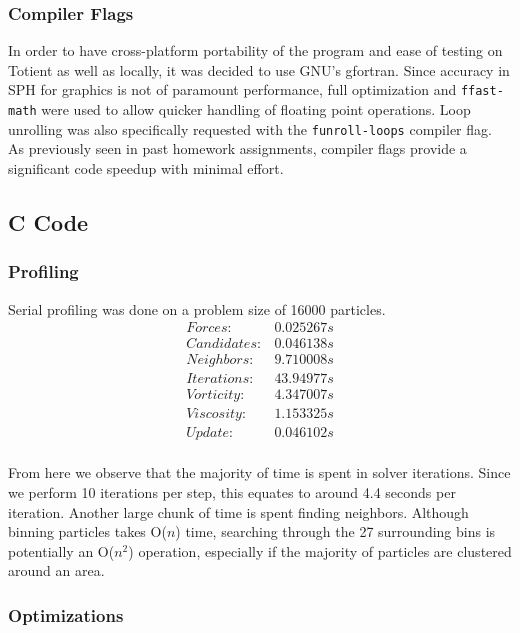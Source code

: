 \documentclass{scrartcl}
\begin{document}
  \subsubsection{Compiler Flags}
  In order to have cross-platform portability of the program and ease of testing on Totient as well as locally, it was decided to use GNU's gfortran. Since accuracy in SPH for graphics is not of paramount performance, full optimization and \texttt{ffast-math} were used to allow quicker handling of floating point operations. Loop unrolling was also specifically requested with the \texttt{funroll-loops} compiler flag. As previously seen in past homework assignments, compiler flags provide a significant code speedup with minimal effort.
 
  \subsection{C Code}
  \subsubsection{Profiling}
          
          Serial profiling was done on a problem size of 16000 particles.
          \[\begin{array}{lc}
          Forces:     & 0.025267 s \\
          Candidates: & 0.046138 s \\
          Neighbors:  & 9.710008 s \\
          Iterations: & 43.94977 s \\
          Vorticity:  & 4.347007 s \\
          Viscosity:  & 1.153325 s \\
          Update:     & 0.046102 s \\
          \end{array}\]
          
          From here we observe that the majority of time is spent in solver iterations. Since we perform 10 iterations per step, this equates to around 4.4 seconds per iteration. Another large chunk of time is spent finding neighbors. Although binning particles takes O($n$) time, searching through the 27 surrounding bins is potentially an O($n^2$) operation, especially if the majority of particles are clustered around an area.
          
              \subsubsection{Optimizations}
\end{document}
